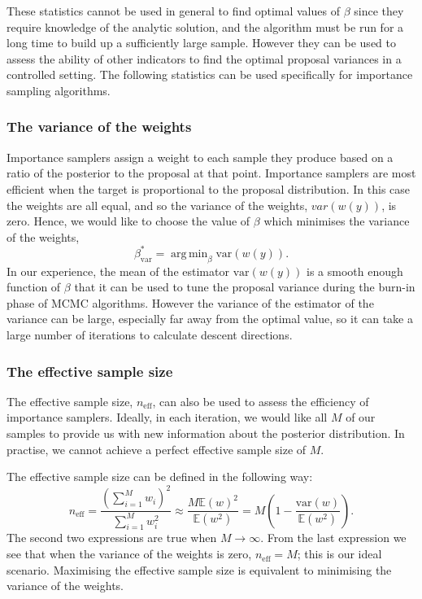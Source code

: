 \documentclass[final]{siamltex}
\newcommand{\neff}{n_{\text{eff}}}
\newcommand{\E}{{\mathbb E}}
\DeclareMathOperator*{\argmin}{arg\,min}
\begin{document}
These statistics cannot be used in general to find optimal values of
$\beta$ since they require knowledge of the analytic solution, and
the algorithm must be run for a long time to build up a
sufficiently large sample. However they can be used to assess the
ability of other indicators to find the optimal proposal
variances in a controlled setting. The following statistics can be used specifically for importance sampling algorithms.

\subsubsection{The variance of the weights}

Importance samplers assign a weight to each sample they produce based
on a ratio of the posterior to the proposal at that point. Importance
samplers are most efficient when the target is proportional to the
proposal distribution. In this case the weights are all equal, and so the variance of the weights, $var(w(y))$, is zero. Hence, we would like to choose the value of $\beta$ which minimises the variance of the weights,
\[
	\beta^*_{\text{var}} = \argmin_{\beta} \text{var}(w(y)).
\]
In our experience, the mean of the estimator
$\text{var}(w(y))$ is a smooth enough function of $\beta$ that it can
be used to tune the proposal variance during the burn-in phase of MCMC
algorithms. However the variance of the estimator of the variance can be large, especially far away from the optimal value, so it can take a large number of iterations to calculate descent directions.

\subsubsection{The effective sample size}\label{sec:ess}

The effective sample size, $\neff$, can also be used to assess the efficiency of importance samplers. Ideally, in each iteration, we would like all $M$ of our samples to provide us with new information about the posterior distribution. In practise, we cannot achieve a perfect effective sample size of $M$.

The effective sample size can be defined in the following way:
\[
	\neff = \frac{\left(\sum_{i=1}^M \! w_i\right)^2}{\sum_{i=1}^M \! w_i^2} \approx \frac{M\E(w)^2}{\E(w^2)} = M\left(1 - \frac{\mbox{var}(w)}{\mathbb{E}(w^2)}\right).
\]
The second two expressions are true when $M\rightarrow\infty$. From
the last expression we see that when the variance of the weights is
zero, $\neff = M$; this is our ideal scenario. Maximising the effective sample size is equivalent to minimising the variance of the weights.
\end{document}

